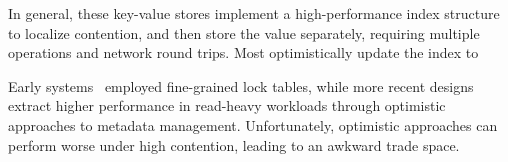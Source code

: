 In general, these key-value stores implement a
high-performance index structure to localize contention, and
then store the value separately, requiring multiple
operations and network round trips. Most optimistically
update the index to 

Early systems~\cite{sherman} employed fine-grained lock
tables, while more recent designs extract higher performance
in read-heavy workloads through optimistic approaches to
metadata management.  Unfortunately, optimistic approaches
can perform worse under high contention, leading to an
awkward trade space.





